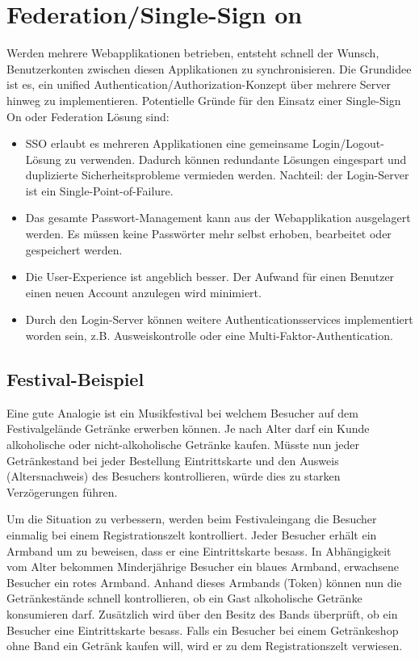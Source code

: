 \chapter{Federation/Single-Sign on}

Werden mehrere Webapplikationen betrieben, entsteht schnell der Wunsch, Benutzerkonten zwischen diesen Applikationen zu synchronisieren. Die Grundidee ist es, ein unified Authentication/Authorization-Konzept über mehrere Server hinweg zu implementieren. Potentielle Gründe für den Einsatz einer Single-Sign On oder Federation Lösung sind:

\begin{itemize}
	\item SSO erlaubt es mehreren Applikationen eine gemeinsame Login/Logout-Lösung zu verwenden. Dadurch können redundante Lösungen eingespart und duplizierte Sicherheitsprobleme vermieden werden. Nachteil: der Login-Server ist ein Single-Point-of-Failure.
	\item Das gesamte Passwort-Management kann aus der Webapplikation ausgelagert werden. Es müssen keine Passwörter mehr selbst erhoben, bearbeitet oder gespeichert werden.
	\item Die User-Experience ist angeblich besser. Der Aufwand für einen Benutzer einen neuen Account anzulegen wird minimiert.
	\item Durch den Login-Server können weitere Authenticationsservices implementiert worden sein, z.B. Ausweiskontrolle oder eine Multi-Faktor-Authentication.
\end{itemize}

\section{Festival-Beispiel}

Eine gute Analogie ist ein Musikfestival bei welchem Besucher auf dem Festivalgelände Getränke erwerben können. Je nach Alter darf ein Kunde alkoholische oder nicht-alkoholische Getränke kaufen. Müsste nun jeder Getränkestand bei jeder Bestellung Eintrittskarte und den Ausweis (Altersnachweis) des Besuchers kontrollieren, würde dies zu starken Verzögerungen führen.

Um die Situation zu verbessern, werden beim Festivaleingang die Besucher einmalig bei einem Registrationszelt kontrolliert. Jeder Besucher erhält ein Armband um zu beweisen, dass er eine Eintrittskarte besass. In Abhängigkeit vom Alter bekommen Minderjährige Besucher ein blaues Armband, erwachsene Besucher ein rotes Armband. Anhand dieses Armbands (Token) können nun die Getränkestände schnell kontrollieren, ob ein Gast alkoholische Getränke konsumieren darf. Zusätzlich wird über den Besitz des Bands überprüft, ob ein Besucher eine Eintrittskarte besass. Falls ein Besucher bei einem Getränkeshop ohne Band ein Getränk kaufen will, wird er zu dem Registrationszelt  verwiesen.

